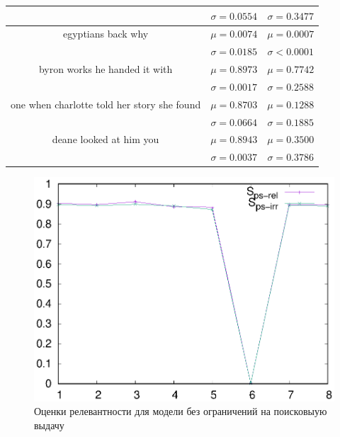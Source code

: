 \begin{table}[tbp]
\begin{center}
\begin{tabular}{ccc}
                                                      & \(\sigma=0.0554\)                                 & \(\sigma=0.3477\)           \\
            \midrule
            egyptians back      why                   & \(\mu=0.0074\)                                    & \(\mu=0.0007\)              \\
                                                      & \(\sigma=0.0185\)                                 & \(\sigma<0.0001\)           \\
            \midrule
            byron works   he handed it with           & \(\mu=0.8973\)                                    & \(\mu=0.7742\)              \\
                                                      & \(\sigma=0.0017\)                                 & \(\sigma=0.2588\)           \\
            \midrule
            one when charlotte told her story she found& \(\mu=0.8703\)                                    & \(\mu=0.1288\)              \\
                                                      & \(\sigma=0.0664\)                                 & \(\sigma=0.1885\)           \\
            \midrule
            deane looked at him    you                & \(\mu=0.8943\)                                    & \(\mu=0.3500\)              \\
                                                      & \(\sigma=0.0037\)                                 & \(\sigma=0.3786\)           \\
            \bottomrule
        \end{tabular}\label{tab6}
    \end{center}
\end{table}

\begin{figure}
    \centerline{\includegraphics[scale=0.8]{313-1_scores.eps}}
    \caption{Оценки релевантности для модели без ограничений на поисковыую выдачу}\label{fig:wv-scores-1}
\end{figure}

